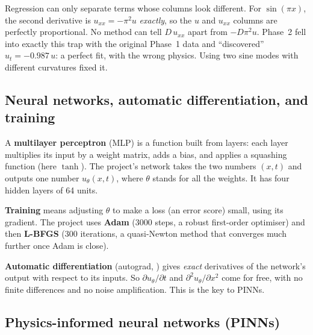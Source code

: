 \begin{caution}
Regression can only separate terms whose columns look different. For $\sin(\pi x)$, the second derivative is
$u_{xx} = -\pi^2 u$ \emph{exactly}, so the $u$ and $u_{xx}$ columns are perfectly proportional. No method can
tell $D\,u_{xx}$ apart from $-D\pi^2 u$. Phase~2 fell into exactly this trap with the original Phase~1 data and
``discovered'' $u_t = -0.987\,u$: a perfect fit, with the wrong physics. Using two sine modes with different
curvatures fixed it.
\end{caution}

\subsection{Neural networks, automatic differentiation, and training}

A \textbf{multilayer perceptron} (MLP) is a function built from layers: each layer multiplies its input by a
weight matrix, adds a bias, and applies a squashing function (here $\tanh$). The project's network takes the two
numbers $(x,t)$ and outputs one number $u_\theta(x,t)$, where $\theta$ stands for all the weights. It has four
hidden layers of 64 units.

\textbf{Training} means adjusting $\theta$ to make a loss (an error score) small, using its gradient. The project
uses \textbf{Adam} (3000 steps, a robust first-order optimiser) and then \textbf{L-BFGS} (300 iterations, a
quasi-Newton method that converges much further once Adam is close).

\textbf{Automatic differentiation} (autograd, ) gives \emph{exact} derivatives of the
network's output with respect to its inputs. So $\partial u_\theta/\partial t$ and
$\partial^2 u_\theta/\partial x^2$ come for free, with no finite differences and no noise amplification. This is
the key to PINNs.

\subsection{Physics-informed neural networks (PINNs)}\label{sec:pinn}

